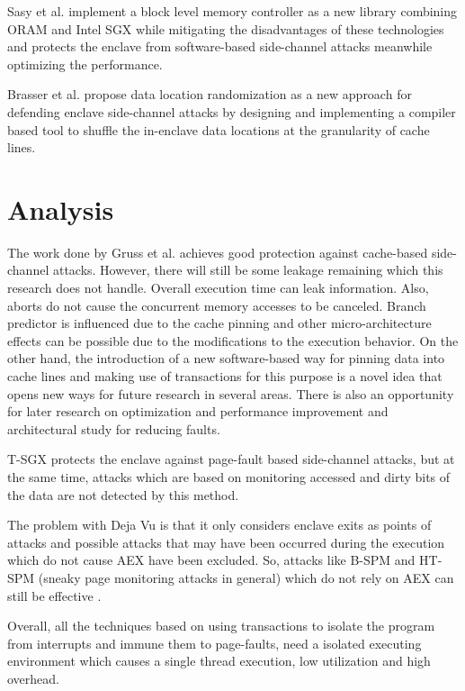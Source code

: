 Sasy et al. \cite{zerotrace} implement a block level memory controller as a new library combining ORAM \cite{oram1,oram2,oram3} and Intel SGX while mitigating the disadvantages of these technologies and protects the enclave from software-based side-channel attacks meanwhile optimizing the performance.

Brasser et al. \cite{drsgx} propose data location randomization as a new approach for defending enclave side-channel attacks by designing and implementing a compiler based tool to shuffle the in-enclave data locations at the granularity of cache lines.

\section{Analysis}
The work done by Gruss et al. \cite{cloak} achieves good protection against cache-based side-channel attacks. However, there will still be some leakage remaining which this research does not handle. Overall execution time can leak information. Also, aborts do not cause the concurrent memory accesses to be canceled. Branch predictor is influenced due to the cache pinning and other micro-architecture effects can be possible due to the modifications to the execution behavior. On the other hand, the introduction of a new software-based way for pinning data into cache lines and making use of transactions for this purpose is a novel idea that opens new ways for future research in several areas. There is also an opportunity for later research on optimization and performance improvement and architectural study for reducing faults.

T-SGX \cite{tsgx} protects the enclave against page-fault based side-channel attacks, but at the same time, attacks which are based on monitoring accessed and dirty bits of the data are not detected by this method.

The problem with Deja Vu \cite{dejavu} is that it only considers enclave exits as points of attacks and possible attacks that may have been occurred during the execution which do not cause AEX have been excluded. So, attacks like B-SPM and HT-SPM (sneaky page monitoring attacks in general) which do not rely on AEX can still be effective \cite{leakycauldron}.

Overall, all the techniques based on using transactions to isolate the program from interrupts and immune them to page-faults, need a isolated executing environment which causes a single thread execution, low utilization and high overhead.

